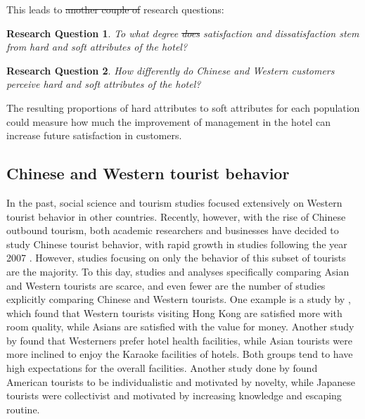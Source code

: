 \documentclass[smallextended,natbib]{svjour3}       %
\makeatletter
\newtheorem{rsq}{Research Question}
\newcounter{subrsq}
\newenvironment{subrsq}
         {%
          \setcounter{subrsq}{0}%
          \stepcounter{rsq}%
          \edef\saved@rsq{\thersq}%
          \let\c@rsq\c@subrsq     %
          \renewcommand{\thersq}{\saved@rsq\alph{rsq}}%
         }
         {}
\providecommand{\DIFadd}[1]{{\protect\color{blue}\uwave{#1}}} %
\providecommand{\DIFdel}[1]{{\protect\color{red}\sout{#1}}}                      %
\providecommand{\DIFaddbegin}{} %
\providecommand{\DIFaddend}{} %
\providecommand{\DIFdelbegin}{} %
\providecommand{\DIFdelend}{} %
\newcommand{\DIFscaledelfig}{0.5}
\newlength{\DIFdelgraphicswidth} %
\newlength{\DIFdelgraphicsheight} %
\newcommand{\DIFaddincludegraphics}[2][]{{\color{blue}\fbox{\DIFOincludegraphics[#1]{#2}}}} %
\newcommand{\DIFdelincludegraphics}[2][]{%
\sbox{\DIFdelgraphicsbox}{\DIFOincludegraphics[#1]{#2}}%
\settoboxwidth{\DIFdelgraphicswidth}{\DIFdelgraphicsbox} %
\settoboxtotalheight{\DIFdelgraphicsheight}{\DIFdelgraphicsbox} %
\scalebox{\DIFscaledelfig}{%
\parbox[b]{\DIFdelgraphicswidth}{\usebox{\DIFdelgraphicsbox}\\[-\baselineskip] \rule{\DIFdelgraphicswidth}{0em}}\llap{\resizebox{\DIFdelgraphicswidth}{\DIFdelgraphicsheight}{%
\setlength{\unitlength}{\DIFdelgraphicswidth}%
\begin{picture}(1,1)%
\thicklines\linethickness{2pt} %
{\color[rgb]{1,0,0}\put(0,0){\framebox(1,1){}}}%
{\color[rgb]{1,0,0}\put(0,0){\line( 1,1){1}}}%
{\color[rgb]{1,0,0}\put(0,1){\line(1,-1){1}}}%
\end{picture}%
}\hspace*{3pt}}} %
} %
\DeclareRobustCommand{\DIFaddbegin}{\DIFOaddbegin \let\includegraphics\DIFaddincludegraphics} %
\DeclareRobustCommand{\DIFaddend}{\DIFOaddend \let\includegraphics\DIFOincludegraphics} %
\DeclareRobustCommand{\DIFdelbegin}{\DIFOdelbegin \let\includegraphics\DIFdelincludegraphics} %
\DeclareRobustCommand{\DIFdelend}{\DIFOaddend \let\includegraphics\DIFOincludegraphics} %
\makeatother
\begin{document}
    \DIFaddend This leads to \DIFdelbegin \DIFdel{another couple of }\DIFdelend \DIFaddbegin \DIFadd{two of our }\DIFaddend research questions:

    \begin{subrsq}
    \begin{rsq}
    \label{rsq:hard_soft}
    To what degree \DIFdelbegin \DIFdel{does }\DIFdelend \DIFaddbegin \DIFadd{do }\DIFaddend satisfaction and dissatisfaction stem from hard and soft attributes of the hotel?
    \end{rsq}

    \begin{rsq}
    \label{rsq:hard_soft_diff}
    How differently do Chinese and Western customers perceive hard and soft attributes of the hotel?
    \end{rsq}
    \end{subrsq}

    The resulting proportions of hard attributes to soft attributes for each population could measure how much the improvement of management in the hotel can increase future satisfaction in customers. 

  \subsection{Chinese and Western tourist behavior}\label{theory_zh_en}

    In the past, social science and tourism studies focused extensively on Western tourist behavior in other countries. Recently, however, with the rise of Chinese outbound tourism, both academic researchers and businesses have decided to study Chinese tourist behavior, with rapid growth in studies following the year 2007 \cite[][]{sun2017}. However, studies focusing on only the behavior of this subset of tourists are the majority. To this day, studies and analyses specifically comparing Asian and Western tourists are scarce, and even fewer are the number of studies explicitly comparing Chinese and Western tourists. One example is a study by \cite{choi2000}, which found that Western tourists visiting Hong Kong are satisfied more with room quality, while Asians are satisfied with the value for money. Another study by \cite{bauer1993changing} found that Westerners prefer hotel health facilities, while Asian tourists were more inclined to enjoy the Karaoke facilities of hotels. Both groups tend to have high expectations for the overall facilities. Another study done by \cite{kim2000} found American tourists to be individualistic and motivated by novelty, while Japanese tourists were collectivist and motivated by increasing knowledge and escaping routine.
\end{document}

